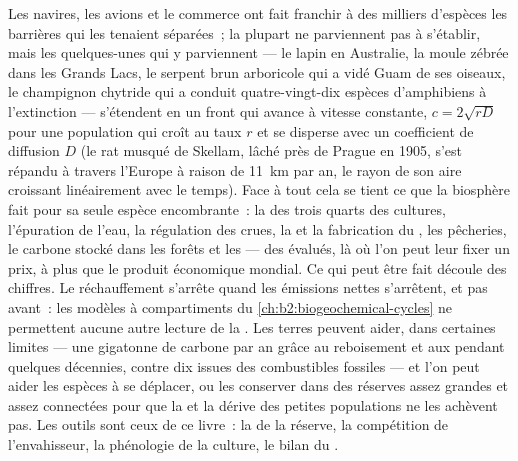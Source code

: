 \begin{proposition}\label{prop:b2:global-change:invasion}
Les navires, les avions et le commerce ont fait franchir à des milliers
d'espèces les barrières qui les tenaient séparées~; la plupart ne
parviennent pas à s'établir, mais les quelques-unes qui y parviennent ---
le lapin en Australie, la moule zébrée dans les Grands Lacs, le serpent
brun arboricole qui a vidé Guam de ses oiseaux, le champignon chytride
qui a conduit quatre-vingt-dix espèces d'amphibiens à l'extinction ---
s'étendent en un front qui avance à vitesse constante, $c =
2\sqrt{rD}$ pour une population qui croît au taux $r$ et se disperse
avec un coefficient de diffusion $D$ (le rat musqué de Skellam, lâché
près de Prague en 1905, s'est répandu à travers l'Europe à raison de
\qty{11}{km} par an, le rayon de son aire croissant linéairement avec le
temps). Face à tout cela se tient ce que la biosphère fait pour sa seule
espèce encombrante~: la  des trois quarts des cultures,
l'épuration de l'eau, la régulation des crues, la  et
la fabrication du , les pêcheries, le carbone stocké dans les forêts
et les  --- des \emph{} évalués, là où l'on
peut leur fixer un prix, à plus que le produit économique mondial. Ce qui
peut être fait découle des chiffres.
Le réchauffement s'arrête quand les émissions nettes s'arrêtent, et pas
avant~: les modèles à compartiments du
\cref{ch:b2:biogeochemical-cycles} ne permettent aucune autre lecture de
la \emph{}. Les terres peuvent aider, dans certaines
limites --- une gigatonne de carbone par an grâce au reboisement et aux
 pendant quelques décennies, contre dix issues des combustibles
fossiles --- et l'on peut aider les espèces à se déplacer, ou les
conserver dans des réserves assez grandes et assez connectées pour que
la  et la dérive des petites populations ne les
achèvent pas. Les outils sont ceux de ce livre~: la  de la réserve, la compétition de l'envahisseur, la
phénologie de la culture, le bilan du .
\end{proposition}

